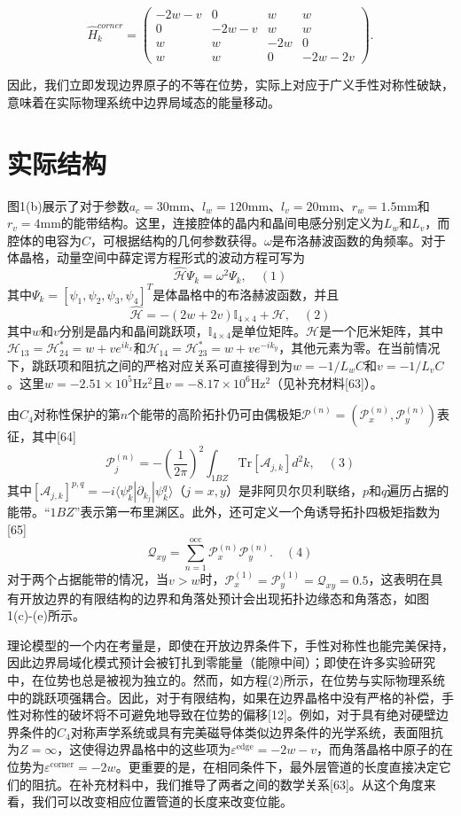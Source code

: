 \begin{equation}
\hat{H}_k^{corner} = 
\begin{pmatrix}
-2w - v & 0 & w & w \\
0 & -2w - v & w & w \\
w & w & -2w & 0 \\
w & w & 0 & -2w - 2v
\end{pmatrix}.
\label{eq4-12}
\end{equation}

因此，我们立即发现边界原子的不等在位势，实际上对应于广义手性对称性破缺\cite{i5}，意味着在实际物理系统中边界局域态的能量移动。

\section{实际结构}
图1(b)展示了对于参数$a_c = 30$mm、$l_w = 120$mm、$l_v = 20$mm、$r_w = 1.5$mm和$r_v = 4$mm的能带结构。这里，连接腔体的晶内和晶间电感分别定义为$L_w$和$L_v$，而腔体的电容为$C$，可根据结构的几何参数获得。$\omega$是布洛赫波函数的角频率。对于体晶格，动量空间中薛定谔方程形式的波动方程可写为
$$\hat{\mathscr{H}}\Psi_k = \omega^2\Psi_k, \quad (1)$$
其中$\Psi_k = [\psi_1, \psi_2, \psi_3, \psi_4]^T$是体晶格中的布洛赫波函数，并且
$$\hat{\mathscr{H}} = -(2w + 2v)\mathbb{I}_{4\times4} + \mathscr{H}, \quad (2)$$
其中$w$和$v$分别是晶内和晶间跳跃项，$\mathbb{I}_{4\times4}$是单位矩阵。$\mathscr{H}$是一个厄米矩阵，其中$\mathscr{H}_{13} = \mathscr{H}_{24}^* = w + ve^{ik_x}$和$\mathscr{H}_{14} = \mathscr{H}_{23}^* = w + ve^{-ik_y}$，其他元素为零。在当前情况下，跳跃项和阻抗之间的严格对应关系可直接得到为$w = -1/L_wC$和$v = -1/L_vC$。这里$w = -2.51\times 10^5$Hz$^2$且$v = -8.17\times 10^6$Hz$^2$（见补充材料[63]）。

由$C_4$对称性保护的第$n$个能带的高阶拓扑仍可由偶极矩$\mathscr{P}^{(n)} = (\mathscr{P}_x^{(n)}, \mathscr{P}_y^{(n)})$表征，其中[64]
$$\mathscr{P}_j^{(n)} = -\left(\frac{1}{2\pi}\right)^2 \int_{1BZ} \text{Tr}[\mathscr{A}_{j,k}]d^2k, \quad (3)$$
其中$[\mathscr{A}_{j,k}]^{p,q} = -i\langle\psi_k^p|\partial_{k_j}|\psi_k^q\rangle$（$j = x,y$）是非阿贝尔贝利联络，$p$和$q$遍历占据的能带。“$1BZ$”表示第一布里渊区。此外，还可定义一个角诱导拓扑四极矩指数为[65]
$$\mathscr{Q}_{xy} = \sum_{n = 1}^{\text{occ}} \mathscr{P}_x^{(n)} \mathscr{P}_y^{(n)}. \quad (4)$$
对于两个占据能带的情况，当$v > w$时，$\mathscr{P}_x^{(1)} = \mathscr{P}_y^{(1)} = \mathscr{Q}_{xy} = 0.5$，这表明在具有开放边界的有限结构的边界和角落处预计会出现拓扑边缘态和角落态，如图1(c)-(e)所示。

理论模型的一个内在考量是，即使在开放边界条件下，手性对称性也能完美保持，因此边界局域化模式预计会被钉扎到零能量（能隙中间）；即使在许多实验研究中，在位势也总是被视为独立的。然而，如方程(2)所示，在位势与实际物理系统中的跳跃项强耦合。因此，对于有限结构，如果在边界晶格中没有严格的补偿，手性对称性的破坏将不可避免地导致在位势的偏移[12]。例如，对于具有绝对硬壁边界条件的$C_4$对称声学系统或具有完美磁导体类似边界条件的光学系统，表面阻抗为$Z = \infty$，这使得边界晶格中的这些项为$\varepsilon^{\text{edge}} = -2w - v$，而角落晶格中原子的在位势为$\varepsilon^{\text{corner}} = -2w$。更重要的是，在相同条件下，最外层管道的长度直接决定它们的阻抗。在补充材料中，我们推导了两者之间的数学关系[63]。从这个角度来看，我们可以改变相应位置管道的长度来改变位能。

